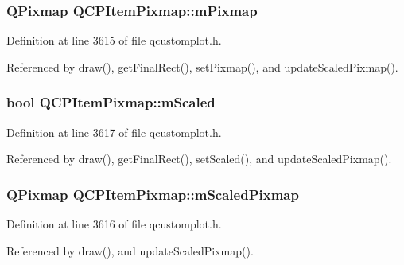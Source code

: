 \subsubsection[{m\+Pixmap}]{\setlength{\rightskip}{0pt plus 5cm}Q\+Pixmap Q\+C\+P\+Item\+Pixmap\+::m\+Pixmap\hspace{0.3cm}{\ttfamily [protected]}}\label{class_q_c_p_item_pixmap_a1396cce7f26c7b8e9512906284380c4d}


Definition at line 3615 of file qcustomplot.\+h.



Referenced by draw(), get\+Final\+Rect(), set\+Pixmap(), and update\+Scaled\+Pixmap().

\hypertarget{class_q_c_p_item_pixmap_a8fe670a529cd46a9b8afd9fc1203bc3f}{}
\subsubsection[{m\+Scaled}]{\setlength{\rightskip}{0pt plus 5cm}bool Q\+C\+P\+Item\+Pixmap\+::m\+Scaled\hspace{0.3cm}{\ttfamily [protected]}}\label{class_q_c_p_item_pixmap_a8fe670a529cd46a9b8afd9fc1203bc3f}


Definition at line 3617 of file qcustomplot.\+h.



Referenced by draw(), get\+Final\+Rect(), set\+Scaled(), and update\+Scaled\+Pixmap().

\hypertarget{class_q_c_p_item_pixmap_a2ebc66e15b9f1264563d58f29ba1bc00}{}
\subsubsection[{m\+Scaled\+Pixmap}]{\setlength{\rightskip}{0pt plus 5cm}Q\+Pixmap Q\+C\+P\+Item\+Pixmap\+::m\+Scaled\+Pixmap\hspace{0.3cm}{\ttfamily [protected]}}\label{class_q_c_p_item_pixmap_a2ebc66e15b9f1264563d58f29ba1bc00}


Definition at line 3616 of file qcustomplot.\+h.



Referenced by draw(), and update\+Scaled\+Pixmap().

